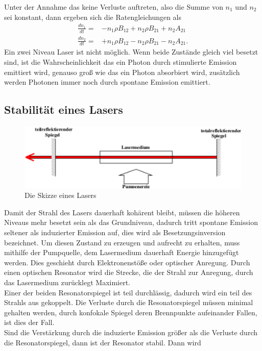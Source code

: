 Unter der Annahme das keine Verluste auftreten, also die Summe von $n_1$ und $n_2$ sei konstant, dann ergeben sich die Ratengleichungen als
\begin{align*}
\frac{dn_1}{dt}=&-n_1 \rho B_{12} + n_2\rho B_{21} + n_2 A_{21}\\
\frac{dn_2}{dt}=&+n_1\rho B_{12} - n_2\rho B_{21} -n_2A_{21}.
\end{align*}
Ein zwei Niveau Laser ist nicht möglich. Wenn beide Zustände gleich viel besetzt sind, ist die Wahrscheinlichkeit das ein Photon durch stimulierte Emission emittiert wird, genauso groß wie das ein Photon absorbiert wird, zusätzlich werden Photonen immer noch durch spontane Emission emittiert.
\subsection{Stabilität eines Lasers}
\begin{figure}[h!]
\centering
\includegraphics[scale=0.75]{../Grafiken/Laser.pdf}
\caption{Die Skizze eines Lasers\cite{V61}\label{SkizzeLaser}}
\end{figure}
Damit der Strahl des Lasers dauerhaft kohärent bleibt, müssen die höheren Niveaus mehr besetzt sein als das Grundniveau, dadurch tritt spontane Emission seltener als induzierter Emission auf, dies wird als Besetzungsinversion bezeichnet. Um diesen Zustand zu erzeugen und aufrecht zu erhalten, muss mithilfe der Pumpquelle, dem Lasermedium dauerhaft Energie hinzugefügt werden. Dies geschieht durch Elektronenstöße oder optischer Anregung. Durch einen optischen Resonator wird die Strecke, die der Strahl zur Anregung, durch das Lasermedium zurücklegt Maximiert.\\
Einer der beiden Resonatorspiegel ist teil durchlässig, dadurch wird ein teil des Strahls aus gekoppelt. Die Verluste durch die Resonatorspiegel müssen minimal gehalten werden, durch konfokale Spiegel deren Brennpunkte aufeinander Fallen, ist dies der Fall.\\
Sind die Verstärkung durch die induzierte Emission größer als die Verluste durch die Resonatorspiegel, dann ist der Resonator stabil. Dann wird
